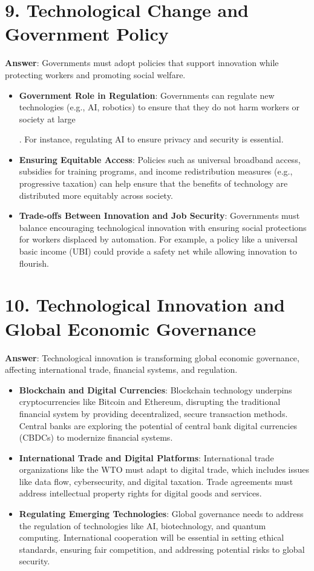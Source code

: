 \documentclass{article}
\begin{document}
\section*{9. Technological Change and Government Policy}
\textbf{Answer}:  
Governments must adopt policies that support innovation while protecting workers and promoting social welfare.

\begin{itemize}
    \item \textbf{Government Role in Regulation}:  
    Governments can regulate new technologies (e.g., AI, robotics) to ensure that they do not harm workers or society at large

. For instance, regulating AI to ensure privacy and security is essential.
    
    \item \textbf{Ensuring Equitable Access}:  
    Policies such as universal broadband access, subsidies for training programs, and income redistribution measures (e.g., progressive taxation) can help ensure that the benefits of technology are distributed more equitably across society.
    
    \item \textbf{Trade-offs Between Innovation and Job Security}:  
    Governments must balance encouraging technological innovation with ensuring social protections for workers displaced by automation. For example, a policy like a universal basic income (UBI) could provide a safety net while allowing innovation to flourish.
\end{itemize}

\section*{10. Technological Innovation and Global Economic Governance}
\textbf{Answer}:  
Technological innovation is transforming global economic governance, affecting international trade, financial systems, and regulation.

\begin{itemize}
    \item \textbf{Blockchain and Digital Currencies}:  
    Blockchain technology underpins cryptocurrencies like Bitcoin and Ethereum, disrupting the traditional financial system by providing decentralized, secure transaction methods. Central banks are exploring the potential of central bank digital currencies (CBDCs) to modernize financial systems.
    
    \item \textbf{International Trade and Digital Platforms}:  
    International trade organizations like the WTO must adapt to digital trade, which includes issues like data flow, cybersecurity, and digital taxation. Trade agreements must address intellectual property rights for digital goods and services.
    
    \item \textbf{Regulating Emerging Technologies}:  
    Global governance needs to address the regulation of technologies like AI, biotechnology, and quantum computing. International cooperation will be essential in setting ethical standards, ensuring fair competition, and addressing potential risks to global security.
\end{itemize}
\end{document}
